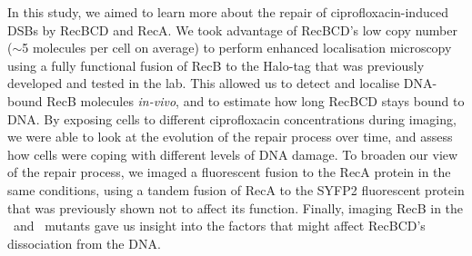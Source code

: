 In this study, we aimed to learn more about the repair of ciprofloxacin-induced DSBs by RecBCD and RecA. We took advantage of RecBCD's low copy number ($\sim$5 molecules per cell on average\cite{Lepore2019a}) to perform enhanced localisation microscopy\cite{Yu2006, Elf2007} using a fully functional fusion of RecB to the Halo-tag that was previously developed and tested in the lab\cite{Lepore2019a}. This allowed us to detect and localise DNA-bound RecB molecules \emph{in-vivo}, and to estimate how long RecBCD stays bound to DNA. By exposing cells to different ciprofloxacin concentrations during imaging, we were able to look at the evolution of the repair process over time, and assess how cells were coping with different levels of DNA damage. To broaden our view of the repair process, we imaged a fluorescent fusion to the RecA protein in the same conditions, using a tandem fusion of RecA to the SYFP2 fluorescent protein that was previously shown not to affect its function\cite{Wiktor2021}. Finally, imaging RecB in the \dreca\ and \teneighty\ mutants gave us insight into the factors that might affect RecBCD's dissociation from the DNA.
